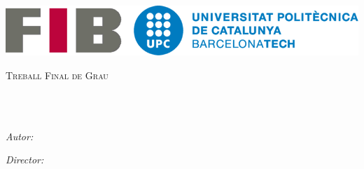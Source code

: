 \documentclass[
11pt, %
catalan, %
singlespacing, %
headsepline, %
]{MastersDoctoralThesis} %
\author{Albert Suàrez} %
\begin{document}
\frontmatter %

\pagestyle{plain} %


\begin{titlepage}
\begin{center}

\includegraphics[scale=0.25]{Figures/logo-upc.png} %

\vspace*{.06\textheight}
{\scshape\LARGE \univname\par}\vspace{1.5cm} %
\textsc{\Large Treball Final de Grau}\\[0.5cm] %

\HRule \\[0.4cm] %
{\huge \bfseries \ttitle\par}\vspace{0.4cm} %
\HRule \\[1.5cm] %
 
\begin{minipage}[t]{0.4\textwidth}
\begin{flushleft} \large
\emph{Autor:}\\
\href{http://www.johnsmith.com}{\authorname} %
\end{flushleft}
\end{minipage}
\begin{minipage}[t]{0.4\textwidth}
\begin{flushright} \large
\emph{Director:} \\
\href{http://www.jamessmith.com}{\supname} %
\end{flushright}
\end{minipage}\\[3cm]
 

\end{center}
\end{titlepage}
\end{document}
